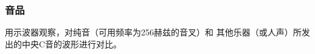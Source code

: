 \subsubsection{音品}
用示波器观察，对纯音（可用频率为256赫兹的音叉）和
其他乐器（或人声）所发出的中央C音的波形进行对比。














































































































